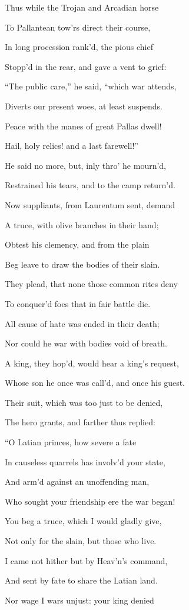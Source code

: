 Thus while the Trojan and Arcadian horse

To Pallantean tow’rs direct their course,

In long procession rank’d, the pious chief

Stopp’d in the rear, and gave a vent to grief:

“The public care,” he said, “which war attends,

Diverts our present woes, at least suspends.

Peace with the manes of great Pallas dwell!

Hail, holy relics! and a last farewell!”

He said no more, but, inly thro’ he mourn’d,

Restrained his tears, and to the camp return’d.

Now suppliants, from Laurentum sent, demand

A truce, with olive branches in their hand;

Obtest his clemency, and from the plain

Beg leave to draw the bodies of their slain.

They plead, that none those common rites deny

To conquer’d foes that in fair battle die.

All cause of hate was ended in their death;

Nor could he war with bodies void of breath.

A king, they hop’d, would hear a king’s request,

Whose son he once was call’d, and once his guest.

Their suit, which was too just to be denied,

The hero grants, and farther thus replied:

“O Latian princes, how severe a fate

In causeless quarrels has involv’d your state,

And arm’d against an unoffending man,

Who sought your friendship ere the war began!

You beg a truce, which I would gladly give,

Not only for the slain, but those who live.

I came not hither but by Heav’n’s command,

And sent by fate to share the Latian land.

Nor wage I wars unjust: your king denied

